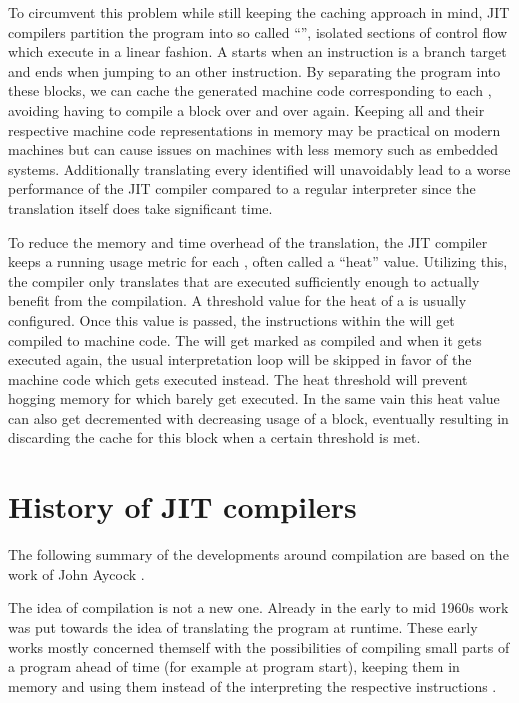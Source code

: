 To circumvent this problem while still keeping the caching approach in mind, JIT compilers partition the program into so called \enquote{\bbs{}}, isolated sections of control flow which execute in a linear fashion. 
A \bb{} starts when an instruction is a branch target and ends when jumping to an other instruction. 
By separating the program into these blocks, we can cache the generated machine code corresponding to each \bb{}, avoiding having to compile a block over and over again. 
Keeping all \bbs{} and their respective machine code representations in memory may be practical on modern machines but can cause issues on machines with less memory such as embedded systems.
Additionally translating every identified \bb{} will unavoidably lead to a worse performance of the JIT compiler compared to a regular interpreter since the translation itself does take significant time. 

To reduce the memory and time overhead of the translation, the JIT compiler keeps a running usage metric for each \bb{}, often called a \enquote{heat} value. 
Utilizing this, the compiler only translates \bbs{} that are executed sufficiently enough to actually benefit from the compilation. 
A threshold value for the heat of a \bb{} is usually configured. 
Once this value is passed, the instructions within the \bb{} will get compiled to machine code.
The \bb{} will get marked as compiled and when it gets executed again, the usual interpretation loop will be skipped in favor of the machine code which gets executed instead. 
The heat threshold will prevent hogging memory for \bbs{} which barely get executed. In the same vain this heat value can also get decremented with decreasing usage of a block, eventually resulting in discarding the cache for this block when a certain threshold is met. 

\section{History of JIT compilers}
The following summary of the developments around \jit{} compilation are based on the work of John Aycock \cite{aycock2003}.

The idea of \jit{} compilation is not a new one.
Already in the early to mid 1960s work was put towards the idea of translating the program at runtime. These early works mostly concerned themself with the possibilities of compiling small parts of a program ahead of time (for example at program start), keeping them in memory and using them instead of the interpreting the respective instructions \cites{mccarthy1960, uom1964}.

